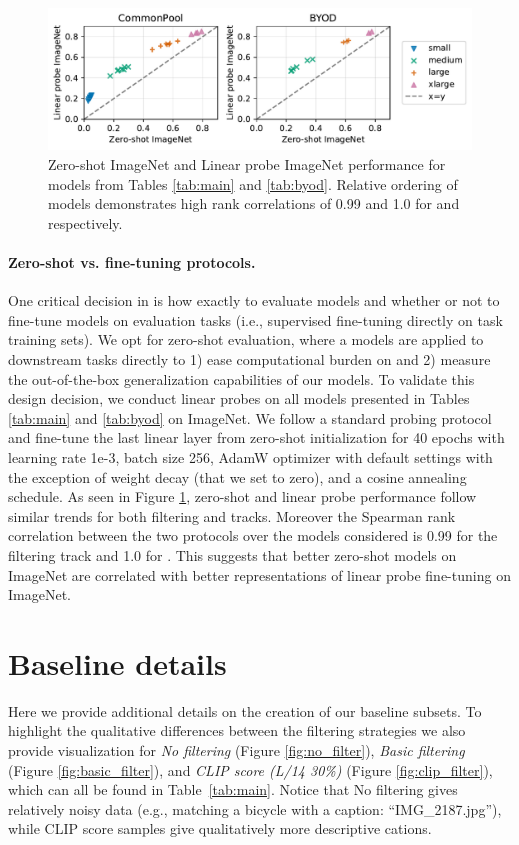 \begin{figure}
    \centering
    \includegraphics[width=.9\textwidth]{figures/linear_probes.pdf}
    \caption{Zero-shot ImageNet and Linear probe ImageNet performance for models from Tables \ref{tab:main} and \ref{tab:byod}. Relative ordering of models demonstrates high rank correlations of 0.99 and 1.0 for \pool and \byod respectively.}
    \label{fig:linear-probes}
\end{figure}

\paragraph{Zero-shot vs. fine-tuning protocols.}
One critical decision in \datanet is how exactly to evaluate models and whether or not to fine-tune models on evaluation tasks (i.e., supervised fine-tuning directly on task training sets). We opt for zero-shot evaluation, where a models are applied to downstream tasks directly to 1) ease computational burden on \users and 2) measure the out-of-the-box generalization capabilities of our models. To validate this design decision, we conduct linear probes on all models presented in Tables \ref{tab:main} and \ref{tab:byod} on ImageNet. We follow a standard probing protocol and fine-tune the last linear layer from zero-shot initialization for 40 epochs with learning rate 1e-3, batch size 256, AdamW optimizer with default settings with the exception of weight decay (that we set to zero), and a cosine annealing schedule. As seen in Figure \ref{fig:linear-probes}, zero-shot and linear probe performance follow similar trends for both filtering and \byod tracks. Moreover the Spearman rank correlation between the two protocols over the models considered is 0.99 for the filtering track and 1.0 for \byod. This suggests that better zero-shot models on ImageNet are correlated with better representations of linear probe fine-tuning on ImageNet.

\section{Baseline details}
\label{sec:app-baselines}
Here we provide additional details on the creation of our baseline subsets.
To highlight the qualitative differences between the filtering strategies we also provide visualization for \emph{No filtering} (Figure \ref{fig:no_filter}), \emph{Basic filtering} (Figure \ref{fig:basic_filter}), and \emph{CLIP score (L/14 30\%)} (Figure \ref{fig:clip_filter}), which can all be found in Table~\ref{tab:main}. Notice that No filtering gives relatively noisy data (e.g., matching a bicycle with a caption: ``IMG\_2187.jpg''), while CLIP score samples give qualitatively more descriptive cations.

